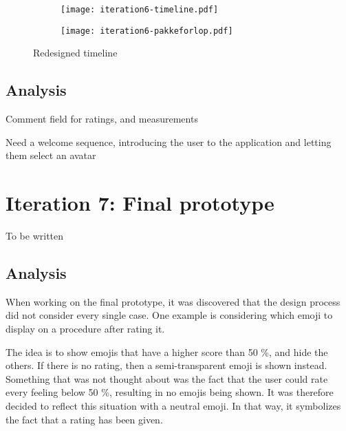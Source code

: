 \begin{figure}
    \centering
    \begin{subfigure}[t]{0.45\textwidth}
        \centering
        \vspace{0pt}
        \texttt{[image: iteration6-timeline.pdf]}
        \label{fig:i6-timeline-zoomin}
    \end{subfigure}
    \begin{subfigure}[t]{0.45\textwidth}
        \centering
        \vspace{0pt}
        \texttt{[image: iteration6-pakkeforlop.pdf]}
        \label{fig:i6-timeline-zoomout}
    \end{subfigure}
    \caption{Redesigned timeline}
    \label{fig:i6-timeline}
\end{figure}



\subsection{Analysis}

Comment field for ratings, and measurements

Need a welcome sequence, introducing the user to the application and letting them select an avatar

\section{Iteration 7: Final prototype}
\label{sec:iteration7}

To be written

\subsection{Analysis}
When working on the final prototype, it was discovered that the design process did not consider every single case. One example is considering which emoji to display on a procedure after rating it.

The idea is to show emojis that have a higher score than 50 \%, and hide the others. If there is no rating, then a semi-transparent emoji is shown instead. Something that was not thought about was the fact that the user could rate every feeling below 50 \%, resulting in no emojis being shown. It was therefore decided to reflect this situation with a neutral emoji. In that way, it symbolizes the fact that a rating has been given.
